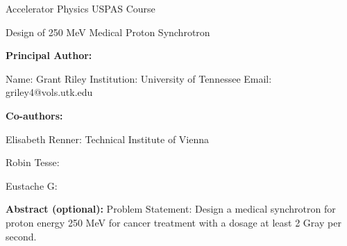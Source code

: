 \documentclass[12pt]{article}
\begin{document}
\raggedright
\huge
Accelerator Physics USPAS Course \linebreak

Design of 250 MeV Medical Proton Synchrotron \linebreak
\normalsize


\textbf{Principal Author:}

Name: Grant Riley
\linebreak           
Institution:  University of Tennessee
\linebreak
Email: griley4@vols.utk.edu
\linebreak

\textbf{Co-authors:}

Elisabeth Renner: Technical Institute of Vienna

Robin Tesse: 

Eustache G: 
\linebreak

\textbf{Abstract  (optional):}
Problem Statement: Design a medical synchrotron for proton energy 250 MeV for cancer treatment with a dosage
at least 2 Gray per second.  

\pagebreak


\pagebreak


\end{document}
